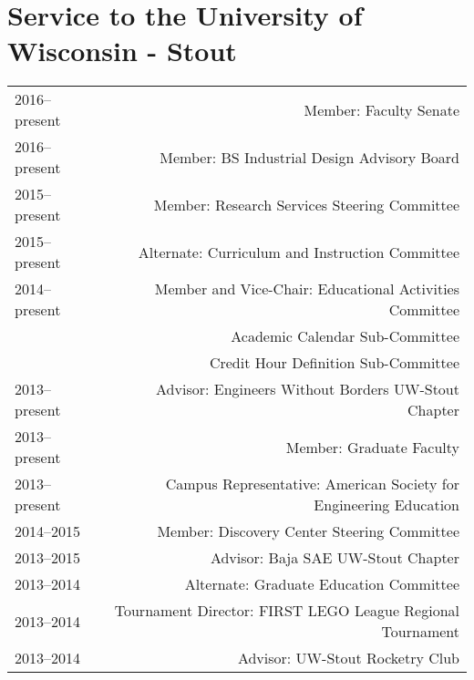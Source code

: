 \section*{Service to the University of Wisconsin - Stout}
\begin{tabular}{L!{\VRule}R}
2016--present&Member: Faculty Senate\\
2016--present&Member: BS Industrial Design Advisory Board\\
2015--present&Member: Research Services Steering Committee \\
2015--present&Alternate: Curriculum and Instruction Committee \\
2014--present&Member and Vice-Chair: Educational Activities Committee \\
 &Academic Calendar Sub-Committee \\
 &Credit Hour Definition Sub-Committee \\
2013--present&Advisor: Engineers Without Borders UW-Stout Chapter \\
2013--present&Member: Graduate Faculty \\
2013--present&Campus Representative: American Society for Engineering Education\\
2014--2015&Member: Discovery Center Steering Committee \\
2013--2015&Advisor: Baja SAE UW-Stout Chapter \\
2013--2014&Alternate: Graduate Education Committee \\
2013--2014&Tournament Director: FIRST LEGO League Regional Tournament\\
2013--2014&Advisor: UW-Stout Rocketry Club\\
\end{tabular}